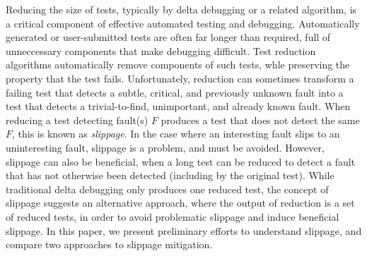 Reducing the size of tests, typically by delta debugging or a related algorithm, is a critical component of effective automated testing and debugging.  Automatically generated or user-submitted tests are often far longer than required, full of unneccessary components that make debugging difficult.  Test reduction algorithms automatically remove components of such tests, whle preserving the property that the test fails.  Unfortunately, reduction can sometimes transform a failing test that detects a subtle, critical, and previously unknown fault into  a test that detects a trivial-to-find, unimportant, and already known fault.  When reducing a test detecting fault(s) $F$ produces a test that does not detect the same $F$, this is known as \emph{slippage}.  In the case where an interesting fault slips to an uninteresting fault, slippage is a problem, and must be avoided.  However, slippage can also be beneficial, when a long test can be reduced to detect a fault that has not otherwise been detected (including by the original test).  While traditional delta debugging only produces one reduced test, the concept of slippage suggests an alternative approach, where the output of reduction is a set of reduced tests, in order to avoid problematic slippage and induce beneficial slippage.
 In this paper, we present preliminary efforts to understand slippage, and compare two approaches to slippage mitigation.
